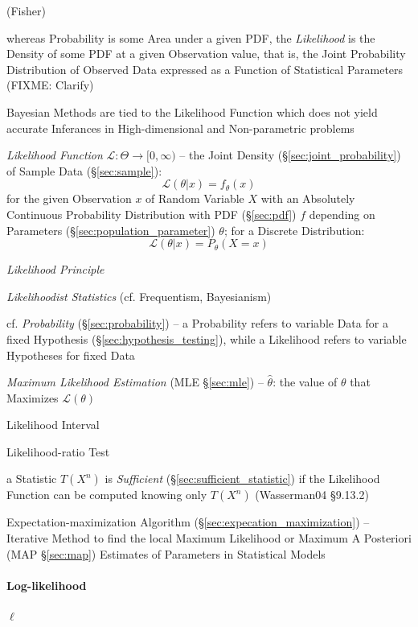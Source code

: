 (Fisher)

whereas Probability is some Area under a given PDF, the \emph{Likelihood} is the
Density of some PDF at a given Observation value, that is, the Joint Probability
Distribution of Observed Data expressed as a Function of Statistical Parameters
(FIXME: Clarify)

\fist Bayesian Methods are tied to the Likelihood Function which does not yield
accurate Inferances in High-dimensional and Non-parametric problems

\emph{Likelihood Function} $\mathcal{L} : \Theta \to [0, \infty)$ -- the
  Joint Density (\S\ref{sec:joint_probability}) of Sample Data
  (\S\ref{sec:sample}):
\[
  \mathcal{L}(\theta | x) = f_\theta(x)
\]
for the given Observation $x$ of Random Variable $X$ with an Absolutely
Continuous Probability Distribution with PDF (\S\ref{sec:pdf}) $f$ depending on
Parameters (\S\ref{sec:population_parameter}) $\theta$; for a Discrete
Distribution:
\[
  \mathcal{L}(\theta | x) = P_\theta(X = x)
\]

\emph{Likelihood Principle}

\emph{Likelihoodist Statistics} (cf. Frequentism, Bayesianism)

cf. \emph{Probability} (\S\ref{sec:probability}) -- a Probability refers to
variable Data for a fixed Hypothesis (\S\ref{sec:hypothesis_testing}), while a
Likelihood refers to variable Hypotheses for fixed Data

\emph{Maximum Likelihood Estimation} (MLE \S\ref{sec:mle}) -- $\hat{\theta}$:
the value of $\theta$ that Maximizes $\mathcal{L}(\theta)$

Likelihood Interval

Likelihood-ratio Test

\fist a Statistic $T(X^n)$ is \emph{Sufficient}
(\S\ref{sec:sufficient_statistic}) if the Likelihood Function can be computed
knowing only $T(X^n)$ (Wasserman04 \S9.13.2)

Expectation-maximization Algorithm (\S\ref{sec:expecation_maximization}) --
Iterative Method to find the local Maximum Likelihood or Maximum A Posteriori
(MAP \S\ref{sec:map}) Estimates of Parameters in Statistical Models



\paragraph{Log-likelihood}\label{sec:log_likelihood}\hfill

$\ell$

